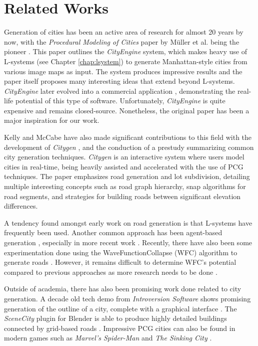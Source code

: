 \section{Related Works}

Generation of cities has been an active area of research for almost 20 years by now, with the \textit{Procedural Modeling of Cities} paper by Müller et al. being the pioneer \cite{muller_city_gen}.
This paper outlines the \textit{CityEngine} system, which makes heavy use of L-systems (see Chapter \ref{chap:lsystem}) to generate Manhattan-style cities from various image maps as input.
The system produces impressive results and the paper itself proposes many interesting ideas that extend beyond L-systems.
\textit{CityEngine} later evolved into a commercial application \cite{esri}, demonstrating the real-life potential of this type of software.
Unfortunately, \textit{CityEngine} is quite expensive and remains closed-source.
Nonetheless, the original paper has been a major inspiration for our work.

Kelly and McCabe have also made significant contributions to this field with the development of \textit{Citygen} \cite{citygen_paper}, and the conduction of a prestudy \cite{citygen_paper_prestudy} summarizing common city generation techniques. 
\textit{Citygen} is an interactive system where users model cities in real-time, being heavily assisted and accelerated with the use of PCG techniques.
The paper emphasizes road generation and lot subdivision, detailing multiple interesting concepts such as road graph hierarchy, snap algorithms for road segments, and strategies for building roads between significant elevation differences.

A tendency found amongst early work on road generation is that L-systems have frequently been used.
Another common approach has been agent-based generation \cite{agent_based_roads}, especially in more recent work \cite{tmwhere} \cite{robin}.
Recently, there have also been some experimentation done using the WaveFunctionCollapse (WFC) algorithm \cite{wavefunc} to generate roads \cite{wavefunc_roads}.
However, it remains difficult to determine WFC's potential compared to previous approaches as more research needs to be done \cite[p.50]{wavefunc_roads}.

Outside of academia, there has also been promising work done related to city generation.
A decade old tech demo from \textit{Introversion Software} shows promising generation of the outline of a city, complete with a graphical interface \cite{subversion}.
The \textit{SceneCity} plugin for Blender \cite{blender} is able to produce highly detailed buildings connected by grid-based roads \cite{scenecity}.
Impressive PCG cities can also be found in modern games such as \textit{Marvel's Spider-Man} \cite{pcg_spiderman} and \textit{The Sinking City} \cite{pcg_sunken_city}.

